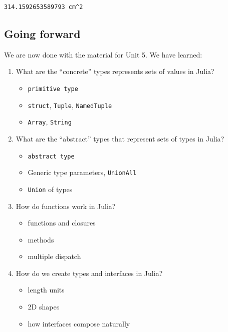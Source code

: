 \documentclass[
]{article}
\providecommand{\tightlist}{%
  \setlength{\itemsep}{0pt}\setlength{\parskip}{0pt}}
\begin{document}
\begin{verbatim}
314.1592653589793 cm^2
\end{verbatim}

\subsection{Going forward}\label{going-forward}

We are now done with the material for Unit 5. We have learned:

\begin{enumerate}
\def\labelenumi{\arabic{enumi}.}
\tightlist
\item
  What are the ``concrete'' types represents sets of values in Julia?

  \begin{itemize}
  \tightlist
  \item
    \texttt{primitive\ type}
  \item
    \texttt{struct}, \texttt{Tuple}, \texttt{NamedTuple}
  \item
    \texttt{Array}, \texttt{String}
  \end{itemize}
\item
  What are the ``abstract'' types that represent sets of types in Julia?

  \begin{itemize}
  \tightlist
  \item
    \texttt{abstract\ type}
  \item
    Generic type parameters, \texttt{UnionAll}
  \item
    \texttt{Union} of types
  \end{itemize}
\item
  How do functions work in Julia?

  \begin{itemize}
  \tightlist
  \item
    functions and closures
  \item
    methods
  \item
    multiple dispatch
  \end{itemize}
\item
  How do we create types and interfaces in Julia?

  \begin{itemize}
  \tightlist
  \item
    length units
  \item
    2D shapes
  \item
    how interfaces compose naturally
  \end{itemize}
\end{enumerate}
\end{document}
